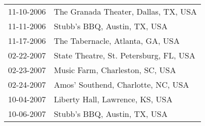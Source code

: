 \begin{supertabular}{ll}
 11-10-2006 &    The Granada Theater, Dallas, TX, USA \\
 11-11-2006 &            Stubb's BBQ, Austin, TX, USA \\
 11-17-2006 &        The Tabernacle, Atlanta, GA, USA \\
 02-22-2007 &  State Theatre, St. Petersburg, FL, USA \\
 02-23-2007 &         Music Farm, Charleston, SC, USA \\
 02-24-2007 &      Amos' Southend, Charlotte, NC, USA \\
 10-04-2007 &         Liberty Hall, Lawrence, KS, USA \\
 10-06-2007 &            Stubb's BBQ, Austin, TX, USA \\
\end{supertabular}
